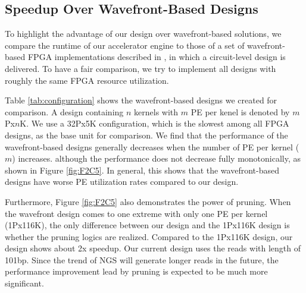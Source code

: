 \subsection{Speedup Over Wavefront-Based Designs}
To highlight the advantage of our design over wavefront-based solutions, 
we compare the runtime of our accelerator engine to those of a set of wavefront-based FPGA implementations described in \cite{Zhang2007}, in which a circuit-level design is delivered. To have a fair comparison, we try to implement all designs with roughly the same FPGA resource utilization.

Table \ref{tab:configuration} shows the wavefront-based designs we created for comparison. 
A design containing $n$ kernels with $m$ PE per kenel is denoted by $m$Px$n$K. 
We use a 32Px5K configuration, which is the slowest among all FPGA designs, as the base unit for comparison.
We find that the performance of the wavefront-based designs generally decreases when the number of PE per kernel ($m$) increases.
although the performance does not decrease fully monotonically, as shown in Figure \ref{fig:F2C5}.
In general, this shows that the wavefront-based designs have worse PE utilization rates compared to our design. 

Furthermore, Figure \ref{fig:F2C5} also demonstrates the power of pruning. 
When the wavefront design comes to one extreme with only one PE per kernel (1Px116K), 
the only difference between our design and the 1Px116K design is whether the pruning logics are realized. 
Compared to the 1Px116K design, our design shows about 2x speedup.
Our current design uses the reads with length of 101bp.
Since the trend of NGS will generate longer reads in the future, the performance improvement lead by pruning is expected to be much more significant.



